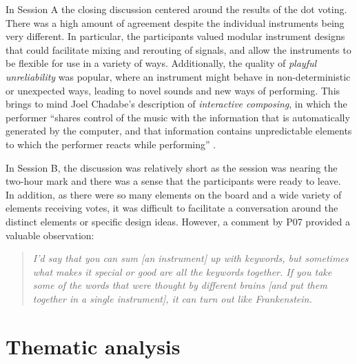 \documentclass[letterpaper, 12pt]{article}
\begin{document}
In Session A the closing discussion centered around the results of the dot voting. There was a high amount of agreement despite the individual instruments being very different. In particular, the participants valued modular instrument designs that could facilitate mixing and rerouting of signals, and allow the instruments to be flexible for use in a variety of ways. Additionally, the quality of \emph{playful unreliability} was popular, where an instrument might behave in non-deterministic or unexpected ways, leading to novel sounds and new ways of performing. 
This brings to mind Joel Chadabe's description of \emph{interactive composing}, in which the performer ``shares control of the music with the information that is automatically generated by the computer, and that information contains unpredictable elements to which the performer reacts while performing'' \citep[p. 23]{Chadabe1984}. 

In Session B, the discussion was relatively short as the session was nearing the two-hour mark and there was a sense that the participants were ready to leave. In addition, as there were so many elements on the board and a wide variety of elements receiving votes, it was difficult to facilitate a conversation around the distinct elements or specific design ideas. However, a comment by P07 provided a valuable observation:  

\begin{quote}
   \emph{ I'd say that you can sum [an instrument] up with keywords, but sometimes what makes it special or good are all the keywords together. If you take some of the words that were thought by different brains [and put them together in a single instrument], it can turn out like Frankenstein.}
\end{quote}

\section{Thematic analysis}
\label{ch3-sec:thematic-analysis}
\end{document}

